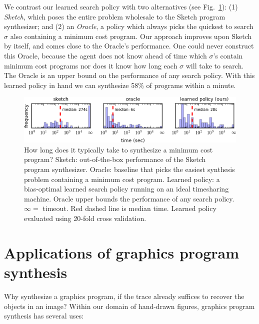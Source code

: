 \documentclass{article}
\newcommand{\remark}[1]{\textcolor{red}{[#1]}}
\theoremstyle{definition}
\begin{document}
We contrast our learned search policy
with two alternatives (see Fig.~\ref{policyEvaluation}):
(1) \emph{Sketch}, which poses the
entire problem wholesale to the Sketch program synthesizer;
and (2) an \emph{Oracle},
a policy which always picks the quickest to search $\sigma $
 also containing a minimum cost program.
Our approach improves upon Sketch by itself,
and comes close to the Oracle's performance.
One could never construct this Oracle,
because the agent does not know ahead of time which
$\sigma $'s contain minimum cost programs nor does it know how long each
$\sigma $ will take to search.
The Oracle is an upper bound on the performance of any search policy.
With this learned policy in hand we can synthesize 58\% of programs within a minute.
\begin{figure}[h]
  \centering  \includegraphics[width = 14cm]{figures/policyComparison.png}
  \caption{How long does it typically take to synthesize a minimum cost program? Sketch: out-of-the-box performance of the Sketch~\citep{solar2008program} program synthesizer. Oracle: baseline that picks the easiest synthesis problem containing a minimum cost program. Learned policy: a bias-optimal learned search policy running on an ideal timesharing machine. Oracle  upper bounds  the performance of any search policy. $\infty = $ timeout. Red dashed line is median time. Learned policy evaluated using 20-fold cross validation.}\label{policyEvaluation}
\end{figure} 







\section{Applications of graphics program synthesis}\label{applicationsSection}
Why synthesize a graphics program,
if the trace already suffices to recover the objects in an image?
Within our domain of hand-drawn figures, graphics program synthesis has several uses:
\end{document}
